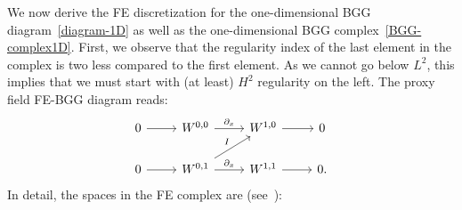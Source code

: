 \documentclass[final]{amsart}%
\newcommand{\0}{\mathaccent23}
\begin{document}
We now derive the FE discretization for the one-di\-men\-sion\-al BGG diagram~\eqref{diagram-1D} as well as the one-dimensional BGG complex~\eqref{BGG-complex1D}. First, we observe that the regularity index of the last element in the complex is two less compared to the first element. As we cannot go below $L^2$, this implies that we must start with (at least) $H^2$ regularity on the left. 
The proxy field FE-BGG diagram reads:
\begin{equation}
    \label{1D:BGG-diagram-FEM}
    \begin{tikzcd}
        0 \arrow{r} &W^{0,0} \arrow{r}{\partial_x} &W^{1,0} \arrow{r}{} & 0\\
        0 \arrow{r} &W^{0,1}\arrow{r}{\partial_x} \arrow[ur, "I"]&W^{1,1} \arrow{r}{} & 0.
    \end{tikzcd}
\end{equation}
In detail, the spaces in the FE complex are (see~\cite{bonizzoni2021h,Bonizzoni-Kanschat2022}):
\end{document}

